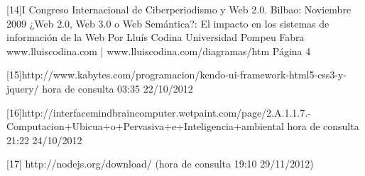 [14]I Congreso Internacional de Ciberperiodismo y Web 2.0. Bilbao: Noviembre 2009
    ¿Web 2.0, Web 3.0 o Web Semántica?: El impacto en los sistemas de
    información de la Web
    Por Lluís Codina
    Universidad Pompeu Fabra
    www.lluiscodina.com | www.lluiscodina.com/diagramas/htm
    Página 4
    
[15]http://www.kabytes.com/programacion/kendo-ui-framework-html5-css3-y-jquery/ hora de consulta 03:35 22/10/2012

[16]http://interfacemindbraincomputer.wetpaint.com/page/2.A.1.1.7.-Computacion+Ubicua+o+Pervasiva+e+Inteligencia+ambiental hora de consulta 
21:22 24/10/2012

[17] http://nodejs.org/download/ (hora de consulta 19:10 29/11/2012) 
